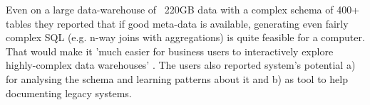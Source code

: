Even on a large data-warehouse of ~220GB data with a complex schema of 400+ tables they reported that if good meta-data is available, generating even fairly complex SQL  (e.g. n-way joins with aggregations) is quite feasible for a computer. That would make it 'much easier for business users to interactively explore highly-complex data warehouses' \cite[p.932]{ethz2012}. The users also reported system's potential a) for analysing the schema and learning patterns about it and b) as tool to help documenting legacy systems.


